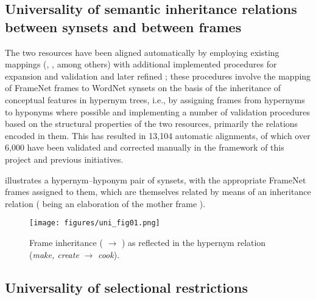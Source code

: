 \documentclass[output=paper,colorlinks,citecolor=brown]{langscibook}
\begin{document}
\subsection{Universality of semantic inheritance relations between synsets and between frames}

The two resources have been aligned automatically by employing existing mappings (\cite{Tonelli2009}, \cite{Palmer2014}, among others) with additional implemented procedures for expansion and validation \citep{Leseva2018} and later refined \citep{Stoyanova2019,Leseva2020}; these procedures involve the mapping of FrameNet frames to WordNet synsets on the basis of the inheritance of conceptual features in hypernym trees, i.e., by assigning frames from hypernyms to hyponyms where possible and implementing a number of validation procedures based on the structural properties of the two resources, primarily the relations encoded in them. This has resulted in 13,104 automatic alignments, of which over 6,000 have been validated and corrected manually in the framework of this project and previous initiatives.

 illustrates a hypernym--hyponym pair of synsets, with the appropriate FrameNet frames assigned to them, which are themselves related by means of an inheritance relation ( being an elaboration of the mother frame ).

\begin{figure}
\texttt{[image: figures/uni\_fig01.png]}
\caption{Frame inheritance ( $\rightarrow$ ) as reflected in the hypernym relation (\textit{make, create} $\rightarrow$ \textit{cook}).}\label{fig:01}
\end{figure} 

\subsection{Universality of selectional restrictions}\label{universality-restrictions}
\end{document}
